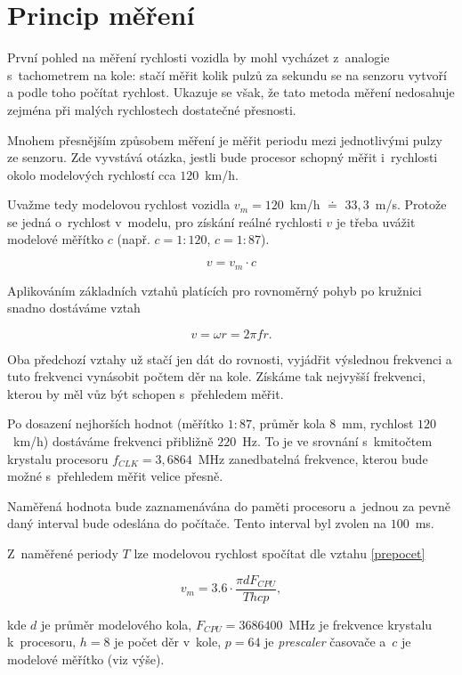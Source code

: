 \section{Princip měření}
\label{sec:wsm-mer-princip}

První pohled na měření rychlosti vozidla by mohl vycházet z~analogie
s~tachometrem na kole: stačí měřit kolik pulzů za sekundu se na senzoru vytvoří
a podle toho počítat rychlost. Ukazuje se však, že tato metoda měření nedosahuje
zejména při malých rychlostech dostatečné přesnosti.

Mnohem přesnějším způsobem měření je měřit periodu mezi jednotlivými pulzy ze
senzoru. Zde vyvstává otázka, jestli bude procesor schopný měřit i~rychlosti
okolo modelových rychlostí cca $120$~km/h.

Uvažme tedy modelovou rychlost vozidla $v_m = 120$~km/h $\doteq$ $33,3$~m/s.
Protože se jedná o~rychlost v~modelu, pro získání reálné rychlosti $v$ je třeba
uvážit modelové měřítko $c$ (např. $c = 1:120$, $c = 1:87$).

$$v = v_m \cdot c$$

Aplikováním základních vztahů platících pro rovnoměrný pohyb po kružnici snadno
dostáváme vztah

$$v = \omega r = 2 \pi f r.$$

Oba předchozí vztahy už stačí jen dát do rovnosti, vyjádřit výslednou frekvenci
a tuto frekvenci vynásobit počtem děr na kole. Získáme tak nejvyšší frekvenci,
kterou by měl vůz být schopen s~přehledem měřit.

Po dosazení nejhorších hodnot (měřítko $1:87$, průměr kola $8$~mm, rychlost
$120$~km/h) dostáváme frekvenci přibližně $220$~Hz. To je ve srovnání
s~kmitočtem krystalu procesoru $f_{CLK} = 3,6864$~MHz zanedbatelná frekvence,
kterou bude možné s~přehledem měřit velice přesně.

Naměřená hodnota bude zaznamenávána do paměti procesoru a~jednou za pevně daný
interval bude odeslána do počítače. Tento interval byl zvolen na $100$~ms.

Z~naměřené periody $T$ lze modelovou rychlost spočítat dle vztahu
\ref{prepocet}

\begin{equation}
v_m = 3.6 \cdot \frac{\pi d F_{CPU}}{T h c p},
\label{prepocet}
\end{equation}

kde $d$ je průměr modelového kola, $F_{CPU} = 3686400$~MHz je frekvence
krystalu k~procesoru, $h = 8$ je počet děr v~kole, $p = 64$ je
\textit{prescaler} časovače a~$c$ je modelové měřítko (viz výše).

